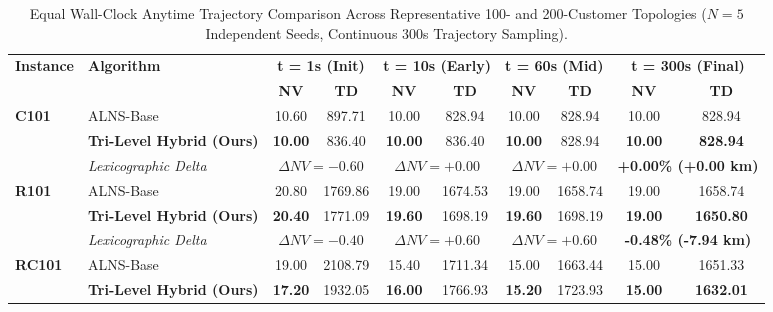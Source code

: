 
\begin{table}[!t]
\caption{Equal Wall-Clock Anytime Trajectory Comparison Across Representative 100- and 200-Customer Topologies ($N=5$ Independent Seeds, Continuous 300s Trajectory Sampling).}
\label{tab:anytime_wallclock}
\centering
\scriptsize
\setlength{\tabcolsep}{3.5pt}
\begin{tabular*}{\textwidth}{@{\extracolsep{\fill}} ll cccccc cc @{}}
\toprule
\multirow{2}{*}{\textbf{Instance}} & \multirow{2}{*}{\textbf{Algorithm}} & \multicolumn{2}{c}{\textbf{t = 1s (Init)}} & \multicolumn{2}{c}{\textbf{t = 10s (Early)}} & \multicolumn{2}{c}{\textbf{t = 60s (Mid)}} & \multicolumn{2}{c}{\textbf{t = 300s (Final)}} \\
\cmidrule(lr){3-4} \cmidrule(lr){5-6} \cmidrule(lr){7-8} \cmidrule(lr){9-10}
 & & \textbf{NV} & \textbf{TD} & \textbf{NV} & \textbf{TD} & \textbf{NV} & \textbf{TD} & \textbf{NV} & \textbf{TD} \\
\midrule
\multirow{3}{*}{\textbf{C101}} & ALNS-Base & 10.60 & 897.71 & 10.00 & 828.94 & 10.00 & 828.94 & 10.00 & 828.94 \\
 & \textbf{Tri-Level Hybrid (Ours)} & \textbf{10.00} & 836.40 & \textbf{10.00} & 836.40 & \textbf{10.00} & 828.94 & \textbf{10.00} & \textbf{828.94} \\
 & \textit{Lexicographic Delta} & \multicolumn{2}{c}{$\Delta NV = -0.60$} & \multicolumn{2}{c}{$\Delta NV = +0.00$} & \multicolumn{2}{c}{$\Delta NV = +0.00$} & \multicolumn{2}{c}{\textbf{+0.00\% (+0.00 km)}} \\
\midrule
\multirow{3}{*}{\textbf{R101}} & ALNS-Base & 20.80 & 1769.86 & 19.00 & 1674.53 & 19.00 & 1658.74 & 19.00 & 1658.74 \\
 & \textbf{Tri-Level Hybrid (Ours)} & \textbf{20.40} & 1771.09 & \textbf{19.60} & 1698.19 & \textbf{19.60} & 1698.19 & \textbf{19.00} & \textbf{1650.80} \\
 & \textit{Lexicographic Delta} & \multicolumn{2}{c}{$\Delta NV = -0.40$} & \multicolumn{2}{c}{$\Delta NV = +0.60$} & \multicolumn{2}{c}{$\Delta NV = +0.60$} & \multicolumn{2}{c}{\textbf{-0.48\% (-7.94 km)}} \\
\midrule
\multirow{3}{*}{\textbf{RC101}} & ALNS-Base & 19.00 & 2108.79 & 15.40 & 1711.34 & 15.00 & 1663.44 & 15.00 & 1651.33 \\
 & \textbf{Tri-Level Hybrid (Ours)} & \textbf{17.20} & 1932.05 & \textbf{16.00} & 1766.93 & \textbf{15.20} & 1723.93 & \textbf{15.00} & \textbf{1632.01} \\

\end{tabular*}
\end{table}
